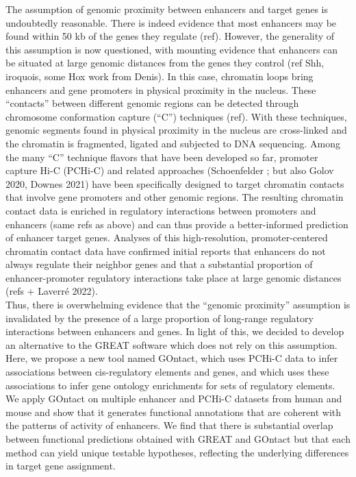 The assumption of genomic proximity between enhancers and target genes is undoubtedly reasonable. There is indeed evidence that most enhancers may be found within 50 kb of the genes they regulate (ref). However, the generality  of this assumption is now questioned, with mounting evidence that enhancers can be situated at large genomic distances from the genes they control (ref Shh, iroquois, some Hox work from Denis). In this case, chromatin loops bring enhancers and gene promoters in physical proximity in the nucleus. These “contacts” between different genomic regions can be detected through chromosome conformation capture (“C”) techniques (ref). With these techniques, genomic segments found in physical proximity in the nucleus are cross-linked and the chromatin is fragmented, ligated and subjected to DNA sequencing. Among the many “C” technique flavors that have been developed so far, promoter capture Hi-C (PCHi-C) and related approaches (Schoenfelder ; but also Golov 2020, Downes 2021) have been specifically designed to target chromatin contacts that involve gene promoters and other genomic regions. The resulting chromatin contact data is enriched in regulatory interactions between promoters and enhancers (same refs as above) and can thus provide a better-informed prediction of enhancer target genes. Analyses of this high-resolution, promoter-centered chromatin contact data have confirmed initial reports that enhancers do not always regulate their neighbor genes and that a substantial proportion of enhancer-promoter regulatory interactions take place at large genomic distances (refs + Laverré 2022). \\

Thus, there is overwhelming evidence that the “genomic proximity” assumption is invalidated by the presence of a large proportion of long-range regulatory interactions between enhancers and genes. In light of this, we decided to develop an alternative to the GREAT software which does not rely on this assumption. Here, we propose a new tool named GOntact, which uses PCHi-C data to infer associations between \acrshort{cis}-regulatory elements and genes, and which uses these associations to infer gene ontology enrichments for sets of regulatory elements. We apply GOntact on multiple enhancer and PCHi-C datasets from human and mouse and show that it generates functional annotations that are coherent with the patterns of activity of enhancers. We find that there is substantial overlap between functional predictions obtained with GREAT and GOntact but that each method can yield unique testable hypotheses, reflecting the underlying differences in target gene assignment. 

